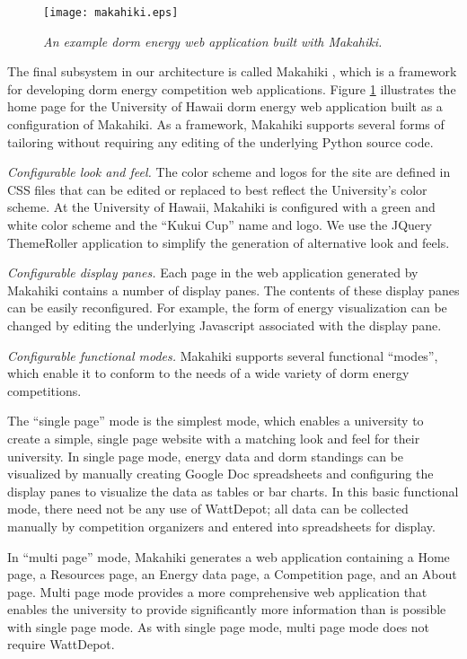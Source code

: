 \begin{figure}[!th]
  \center
  \texttt{[image: makahiki.eps]}
  \caption{\em \small An example dorm energy web application built with Makahiki.}
  \label{fig:makahiki}
\end{figure} 

The final subsystem in our architecture is called Makahiki \cite{makahiki-site}, which is a
framework for developing dorm energy competition web applications.  Figure
\ref{fig:makahiki} illustrates the home page for the University of Hawaii
dorm energy web application built as a configuration of Makahiki. As a
framework, Makahiki supports several forms of tailoring without requiring
any editing of the underlying Python source code.

{\em Configurable look and feel.} The color scheme and logos for the site
are defined in CSS files that can be edited or replaced to best reflect the
University's color scheme. At the University of Hawaii, Makahiki is
configured with a green and white color scheme and the ``Kukui Cup'' name
and logo.   We use the JQuery ThemeRoller application to simplify the generation of 
alternative look and feels.

{\em Configurable display panes.} Each page in the web application generated by Makahiki
contains a number of display panes. The contents of these display panes can be easily 
reconfigured. For example, the form of energy visualization can be changed by editing 
the underlying Javascript associated with the display pane. 

{\em Configurable functional modes.}  Makahiki supports several functional ``modes'', which 
enable it to conform to the needs of a wide variety of dorm energy competitions.  

The ``single page'' mode is the simplest mode, which enables a university
to create a simple, single page website with a matching look and feel for
their university.  In single page mode, energy data and dorm standings can
be visualized by manually creating Google Doc spreadsheets and configuring
the display panes to visualize the data as tables or bar charts.  In this
basic functional mode, there need not be any use of WattDepot; all data can
be collected manually by competition organizers and entered into
spreadsheets for display.

In ``multi page'' mode, Makahiki generates a web application containing a
Home page, a Resources page, an Energy data page, a Competition page, and
an About page.  Multi page mode provides a more comprehensive web
application that enables the university to provide significantly more
information than is possible with single page mode.  As with single page
mode, multi page mode does not require WattDepot.

